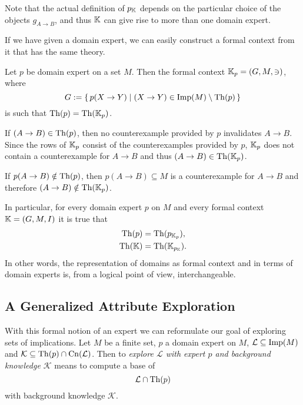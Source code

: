 Note that the actual definition of $p_{{\mathbb{K}}}$ depends on the particular choice of the
objects $g_{A \to B}$, and thus ${\mathbb{K}}$ can give rise to more than one domain expert.

If we have given a domain expert, we can easily construct a formal context from it that
has the same theory.

\begin{Proposition}
  \label{prop:domain-from-domain-expert}
  Let $p$ be domain expert on a set $M$.  Then the formal context ${\mathbb{K}}_p = (G, M, \ni)$,
  where
  \begin{equation*}
    G := {\{\, p(X \to Y) \mid (X \to Y) \in \operatorname{Imp}(M) \setminus \operatorname{Th}(p) \,\}}
  \end{equation*}
  is such that $\operatorname{Th}(p) = \operatorname{Th}({\mathbb{K}}_p)$.
\end{Proposition}
\begin{Proof}
  If $(A \to B) \in \operatorname{Th}(p)$, then no counterexample provided by $p$ invalidates $A \to
  B$.  Since the rows of ${\mathbb{K}}_p$ consist of the counterexamples provided by $p$, ${\mathbb{K}}_p$ does not contain a counterexample for $A \to B$ and thus $(A \to B) \in \operatorname{Th}({\mathbb{K}}_p)$.

  If $p(A \to B) \notin \operatorname{Th}(p)$, then $p(A \to B) \subseteq M$ is a counterexample for $A
  \to B$ and therefore $(A \to B) \notin \operatorname{Th}({\mathbb{K}}_p)$.
\end{Proof}

In particular, for every domain expert $p$ on $M$ and every formal context ${\mathbb{K}} = (G,
M, I)$ it is true that
\begin{align*}
  \operatorname{Th}(p) &= \operatorname{Th}(p_{{\mathbb{K}}_p}), \\
  \operatorname{Th}({\mathbb{K}}) &= \operatorname{Th}({\mathbb{K}}_{p_{{\mathbb{K}}}}).
\end{align*}
In other words, the representation of domains as formal context and in terms of domain
experts is, from a logical point of view, interchangeable.

\subsection{A Generalized Attribute Exploration}
\label{sec:gener-attr-expl}

With this formal notion of an expert we can reformulate our goal of exploring sets of
implications.  Let $M$ be a finite set, $p$ a domain expert on $M$, $\mathcal{L} \subseteq
\operatorname{Imp}(M)$ and $\mathcal{K} \subseteq \operatorname{Th}(p) \cap \operatorname{Cn}(\mathcal{L})$.  Then to \emph{explore
  $\mathcal{L}$ with expert $p$ and background knowledge $\mathcal{K}$} means to compute a
base of
\begin{equation*}
  \mathcal{L} \cap \operatorname{Th}(p)
\end{equation*}
with background knowledge $\mathcal{K}$.

